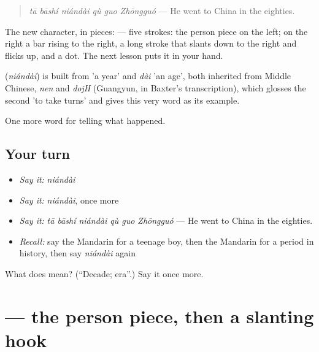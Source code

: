\begin{quote}
\textbf{} \emph{tā bāshí niándài qù guo Zhōngguó} — He went to China in the eighties.
\end{quote}

The new character, in pieces:  — five strokes: the person piece  on the left; on the right a bar rising to the right, a long stroke that slants down to the right and flicks up, and a dot. The next lesson puts it in your hand.

\begin{cousinweb}
\textbf{} (\emph{niándài}) is built from  'a year' and \emph{dài} 'an age', both inherited from Middle Chinese, \emph{nen} and \emph{dojH} (Guangyun, in Baxter's transcription), which glosses the second 'to take turns' and gives this very word as its example.
\end{cousinweb}

\begin{grammarlens}[title={What you've built}]
One more word for telling what happened.
\end{grammarlens}

\subsection*{Your turn}
\begin{itemize}
\raggedright
  \item \emph{Say it:} \emph{niándài}
  \item \emph{Say it:} \emph{niándài}, once more
  \item \emph{Say it:} \emph{tā bāshí niándài qù guo Zhōngguó} — He went to China in the eighties.
  \item \emph{Recall:} say the Mandarin for a teenage boy, then the Mandarin for a period in history, then say \emph{niándài} again
\end{itemize}

\begin{tcolorbox}[breakable,colback=teal!4,colframe=teal!35!black,title={Before you move on}]
What does  mean? (\textquotedblleft{}Decade; era\textquotedblright{}.) Say it once more.
\end{tcolorbox}
\section[\texorpdfstring{\zh{代} (dài)}{代 (dài)}]{ — the person piece, then a slanting hook}


